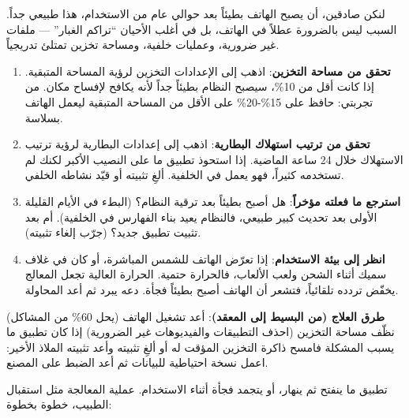 


لنكن صادقين، أن يصبح الهاتف بطيئاً بعد حوالي عام من الاستخدام، هذا طبيعي جداً. السبب ليس بالضرورة عطلاً في الهاتف، بل في أغلب الأحيان “تراكم الغبار” — ملفات غير ضرورية، وعمليات خلفية، ومساحة تخزين تمتلئ تدريجياً.


\begin{enumerate}
  \item \textbf{تحقق من مساحة التخزين}: اذهب إلى الإعدادات التخزين لرؤية المساحة المتبقية. إذا كانت أقل من 10\%، سيصبح النظام بطيئاً جداً لأنه يكافح لإفساح مكان. من تجربتي: حافظ على 15\%-20\% على الأقل من المساحة المتبقية ليعمل الهاتف بسلاسة.
  \item \textbf{تحقق من ترتيب استهلاك البطارية}: اذهب إلى إعدادات البطارية لرؤية ترتيب الاستهلاك خلال 24 ساعة الماضية. إذا استحوذ تطبيق ما على النصيب الأكبر لكنك لم تستخدمه كثيراً، فهو يعمل في الخلفية. ألغِ تثبيته أو قيّد نشاطه الخلفي.
  \item \textbf{استرجع ما فعلته مؤخراً}: هل أصبح بطيئاً بعد ترقية النظام؟ (البطء في الأيام القليلة الأولى بعد تحديث كبير طبيعي، فالنظام يعيد بناء الفهارس في الخلفية). أم بعد تثبيت تطبيق جديد؟ (جرّب إلغاء تثبيته).
  \item \textbf{انظر إلى بيئة الاستخدام}: إذا تعرّض الهاتف للشمس المباشرة، أو كان في غلاف سميك أثناء الشحن ولعب الألعاب، فالحرارة حتمية. الحرارة العالية تجعل المعالج يخفّض تردده تلقائياً، فتشعر أن الهاتف أصبح بطيئاً فجأة. دعه يبرد ثم أعد المحاولة.
\end{enumerate}

\textbf{طرق العلاج (من البسيط إلى المعقد)}: أعد تشغيل الهاتف (يحل 60\% من المشاكل) نظّف مساحة التخزين (احذف التطبيقات والفيديوهات غير الضرورية) إذا كان تطبيق ما يسبب المشكلة فامسح ذاكرة التخزين المؤقت له أو ألغِ تثبيته وأعد تثبيته الملاذ الأخير: اعمل نسخة احتياطية للبيانات ثم أعد الضبط على المصنع.


تطبيق ما ينفتح ثم ينهار، أو يتجمد فجأة أثناء الاستخدام. عملية المعالجة مثل استقبال الطبيب، خطوة بخطوة:

